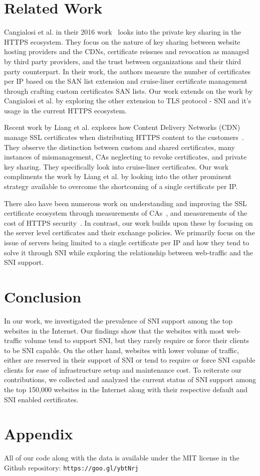 \documentclass{acm_proc_article-sp}
\begin{document}
\section{Related Work} \label{sec:relw}
Cangialosi et al. in their 2016 work~\cite{Cangialosi:2016:MAP:2976749.2978301} looks into the private key sharing in the HTTPS ecosystem. They focus on the nature of key sharing between website hosting providers and the CDNs, certificate reissues and revocation as managed by third party providers, and the trust between organizations and their third party counterpart. In their work, the authors measure the number of certificates per IP based on the SAN list extension and cruise-liner certificate management through crafting custom certificates SAN lists. Our work extends on the work by Cangialosi et al. by exploring the other extension to TLS protocol - SNI and it's usage in the current HTTPS ecosystem.

Recent work by Liang et al. explores how Content Delivery Networks (CDN) manage SSL certificates when distributing HTTPS content to the customers~\cite{Liu:2015:EMC:2815675.2815685}. They observe the distinction between custom and shared certificates, many instances of mismanagement, CAs neglecting to revoke certificates, and private key sharing. They specifically look into cruise-liner certificates. Our work compliments the work by Liang et al. by looking into the other prominent strategy available to overcome the shortcoming of a single certificate per IP. 

There also have been numerous work on understanding and improving the SSL certificate ecosystem through measurements of CAs~\cite{Durumeric:2013:AHC:2504730.2504755,Zhang:2014:ASC:2663716.2663758,laurie2013certificate}, and  measurements of the cost of HTTPS security~\cite{naylor2014cost}. In contrast, our work builds upon these by focusing on the server level certificates and their exchange policies. We primarily focus on the issue of servers being limited to a single certificate per IP and how they tend to solve it through SNI while exploring the relationship between web-traffic and the SNI support.

\section{Conclusion} \label{sec:conc}

In our work, we investigated the prevalence of SNI support among the top websites in the Internet. Our findings show that the websites with most web-traffic volume tend to support SNI, but they rarely require or force their clients to be SNI capable. On the other hand, websites with lower volume of traffic, either are reserved in their support of SNI or tend to require or force SNI capable clients for ease of infrastructure setup and maintenance cost. To reiterate our contributions, we collected and analyzed the current status of SNI support among the top 150,000 websites in the Internet along with their respective default and SNI enabled certificates.



\section*{Appendix}
All of our code along with the data is available under the MIT license in the Github repository: \texttt{https://goo.gl/ybtNrj}
\end{document}
